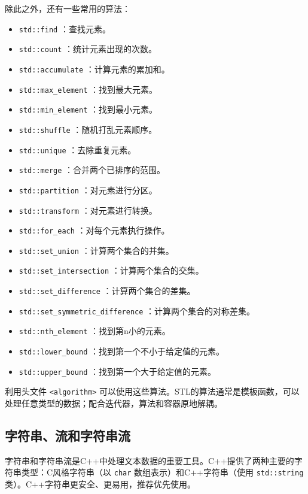 除此之外，还有一些常用的算法：
\begin{itemize}
  \item  \texttt{std::find} ：查找元素。
  \item  \texttt{std::count} ：统计元素出现的次数。
  \item  \texttt{std::accumulate} ：计算元素的累加和。
  \item  \texttt{std::max\_element} ：找到最大元素。
  \item  \texttt{std::min\_element} ：找到最小元素。
  \item  \texttt{std::shuffle} ：随机打乱元素顺序。
  \item  \texttt{std::unique} ：去除重复元素。
  \item  \texttt{std::merge} ：合并两个已排序的范围。
  \item  \texttt{std::partition} ：对元素进行分区。
  \item  \texttt{std::transform} ：对元素进行转换。
  \item  \texttt{std::for\_each} ：对每个元素执行操作。
  \item  \texttt{std::set\_union} ：计算两个集合的并集。
  \item  \texttt{std::set\_intersection} ：计算两个集合的交集。
  \item  \texttt{std::set\_difference} ：计算两个集合的差集。
  \item  \texttt{std::set\_symmetric\_difference} ：计算两个集合的对称差集。
  \item  \texttt{std::nth\_element} ：找到第n小的元素。
  \item  \texttt{std::lower\_bound} ：找到第一个不小于给定值的元素。
  \item  \texttt{std::upper\_bound} ：找到第一个大于给定值的元素。
\end{itemize}

利用头文件 \texttt{<algorithm>} 可以使用这些算法。STL的算法通常是模板函数，可以处理任意类型的数据；配合迭代器，算法和容器原地解耦。

\subsection{字符串、流和字符串流}

字符串和字符串流是C++中处理文本数据的重要工具。C++提供了两种主要的字符串类型：C风格字符串（以 \texttt{char} 数组表示）和C++字符串（使用 \texttt{std::string} 类）。C++字符串更安全、更易用，推荐优先使用。

